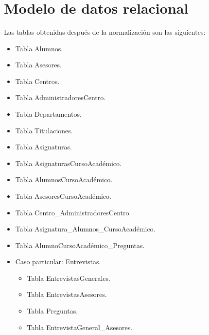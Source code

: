 \section{Modelo de datos relacional}

  \paragraph{}Las tablas obtenidas después de la normalización son las
  siguientes:

  \begin{itemize}
   \item Tabla Alumnos.
   \item Tabla Asesores.
   \item Tabla Centros.
   \item Tabla AdministradoresCentro.
   \item Tabla Departamentos.
   \item Tabla Titulaciones.
   \item Tabla Asignaturas.
   \item Tabla AsignaturasCursoAcadémico.
   \item Tabla AlumnosCursoAcadémico.
   \item Tabla AsesoresCursoAcadémico.
   \item Tabla Centro\_AdministradoresCentro.
   \item Tabla Asignatura\_Alumnos\_CursoAcadémico.
   \item Tabla AlumnoCursoAcadémico\_Preguntas.
   \item Caso particular: Entrevistas.
   \begin{itemize}
    \item Tabla EntrevistasGenerales.
    \item Tabla EntrevistasAsesores.
    \item Tabla Preguntas.
    \item Tabla EntrevistaGeneral\_Asesores.
   \end{itemize}
  \end{itemize}

